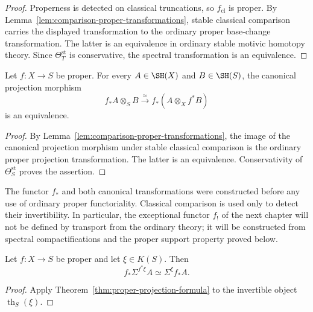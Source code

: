 \begin{proof}
Properness is detected on classical truncations, so
\(f_{\mathrm{cl}}\) is proper.  By
Lemma~\ref{lem:comparison-proper-transformations}, stable classical
comparison carries the displayed transformation to the ordinary proper
base-change transformation.  The latter is an equivalence in ordinary
stable motivic homotopy theory.  Since
\(\Theta_T^{\mathrm{st}}\) is conservative, the spectral transformation is
an equivalence.
\end{proof}

\begin{theorem}
\label{thm:proper-projection-formula}
Let \(f:X\to S\) be proper.  For every
\(A\in\SH(X)\) and \(B\in\SH(S)\), the canonical projection morphism
\[
    f_*A\otimes_SB
    \xrightarrow{\simeq}
    f_*(A\otimes_Xf^*B)
\]
is an equivalence.
\end{theorem}

\begin{proof}
By Lemma~\ref{lem:comparison-proper-transformations}, the image of the
canonical projection morphism under stable classical comparison is the
ordinary proper projection transformation.  The latter is an equivalence.
Conservativity of \(\Theta_S^{\mathrm{st}}\) proves the assertion.
\end{proof}

\begin{remark}
\label{rem:proper-comparison-not-circular}
The functor \(f_*\) and both canonical transformations were constructed
before any use of ordinary proper functoriality.  Classical comparison is
used only to detect their invertibility.  In particular, the exceptional
functor \(f_!\) of the next chapter will not be defined by transport from the
ordinary theory; it will be constructed from spectral compactifications and
the proper support property proved below.
\end{remark}





\begin{corollary}
\label{cor:proper-virtual-projection}
Let \(f:X\to S\) be proper and let \(\xi\in K(S)\).  Then
\[
    f_*\Sigma^{f^*\xi}A
    \simeq
    \Sigma^\xi f_*A.
\]
\end{corollary}

\begin{proof}
Apply Theorem~\ref{thm:proper-projection-formula} to the invertible object
\(\operatorname{th}_S(\xi)\).
\end{proof}

